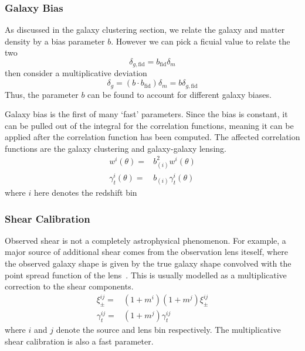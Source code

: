 \subsubsection{Galaxy Bias}
As discussed in the galaxy clustering section, we relate the galaxy and matter density by a bias parameter $b$. However we can pick a ficuial value to relate the two
\begin{equation}
	\delta_{g,\text{fid}} = b_{\text{fid}}\delta_m
\end{equation}
then consider a multiplicative deviation
\begin{equation}
	\delta_g = (b\cdot b_{\text{fid}})\delta_m = b\delta_{g,\text{fid}}
\end{equation}
Thus, the parameter $b$ can be found to account for different galaxy biases. 

Galaxy bias is the first of many `fast' parameters. Since the bias is constant, it can be pulled out of the integral for the correlation functions, meaning it can be applied after the correlation function has been computed. The affected correlation functions are the galaxy clustering and galaxy-galaxy lensing.
\begin{equation}
	\begin{split}
		w^i(\theta) =& b_{(i)}^2w^i(\theta) \\
		\gamma^i_t(\theta) =& b_{(i)}\gamma_t^i(\theta)
	\end{split}
\end{equation}
where $i$ here denotes the redshift bin
\subsubsection{Shear Calibration}
Observed shear is not a completely astrophysical phenomenon. For example, a major source of additional shear comes from the observation lens iteself, where the observed galaxy shape is given by the true galaxy shape convolved with the point spread function of the lens~\cite{hirata_shear_2003,gillis_effects_2019}. This is usually modelled as a multiplicative correction to the shear components.
\begin{equation}
	\begin{split}
		\xi^{ij}_{\pm} =& (1+m^i)(1+m^j) \xi^{ij}_{\pm} \\
		\gamma^{ij}_t =& (1+m^j) \gamma_t^{ij}
	\end{split}
\end{equation}
where $i$ and $j$ denote the source and lens bin respectively. The multiplicative shear calibration is also a fast parameter.
